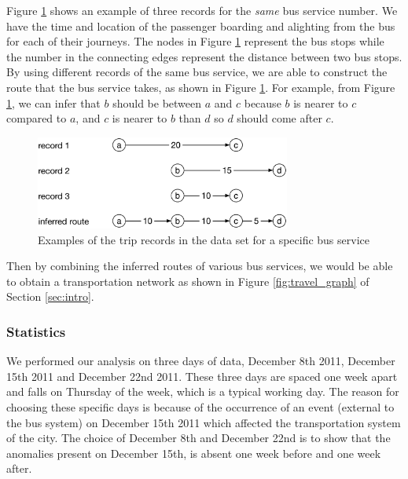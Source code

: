 \documentclass{sig-alternate}
\begin{document}
Figure \ref{fig:trip_example} shows an example of three records for the \emph{same} bus service number. We have the time and location of the passenger boarding and alighting from the bus for each of their journeys. The nodes in Figure \ref{fig:trip_example} represent the bus stops while the number in the connecting edges represent the distance between two bus stops. By using different records of the same bus service, we are able to construct the route that the bus service takes, as shown in Figure \ref{fig:trip_example}. For example, from Figure \ref{fig:trip_example}, we can infer that $b$ should be between $a$ and $c$ because $b$ is nearer to $c$ compared to $a$, and $c$ is nearer to $b$ than $d$ so $d$ should come after $c$.
\begin{figure}[htb]
	\centering
	\includegraphics[width=3.3in]{trip_example}
	\caption{Examples of the trip records in the data set for a specific bus service}
	\label{fig:trip_example}
\end{figure}
Then by combining the inferred routes of various bus services, we would be able to obtain a transportation network as shown in Figure \ref{fig:travel_graph} of Section \ref{sec:intro}. %

\subsubsection{Statistics}

We performed our analysis on three days of data, December 8th 2011, December 15th 2011 and December 22nd 2011. These three days are spaced one week apart and falls on Thursday of the week, which is a typical working day. The reason for choosing these specific days is because of the occurrence of an event (external to the bus system) on December 15th 2011 which affected the transportation system of the city. The choice of December 8th and December 22nd is to show that the anomalies present on December 15th, is absent one week before and one week after. 
\end{document}
